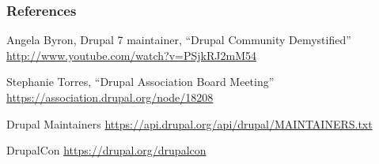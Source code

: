 \begin{frame}
\frametitle{References}


\begin{itemize}
\tiny{
\item Angela Byron, Drupal 7 maintainer, ``Drupal Community Demystified''
 \url{http://www.youtube.com/watch?v=PSjkRJ2mM54}

\item Stephanie Torres, ``Drupal Association Board Meeting''
 \url{https://association.drupal.org/node/18208}

\item Drupal Maintainers
 \url{https://api.drupal.org/api/drupal/MAINTAINERS.txt}

\item DrupalCon
 \url{https://drupal.org/drupalcon}

} %
\end{itemize}

\end{frame}
